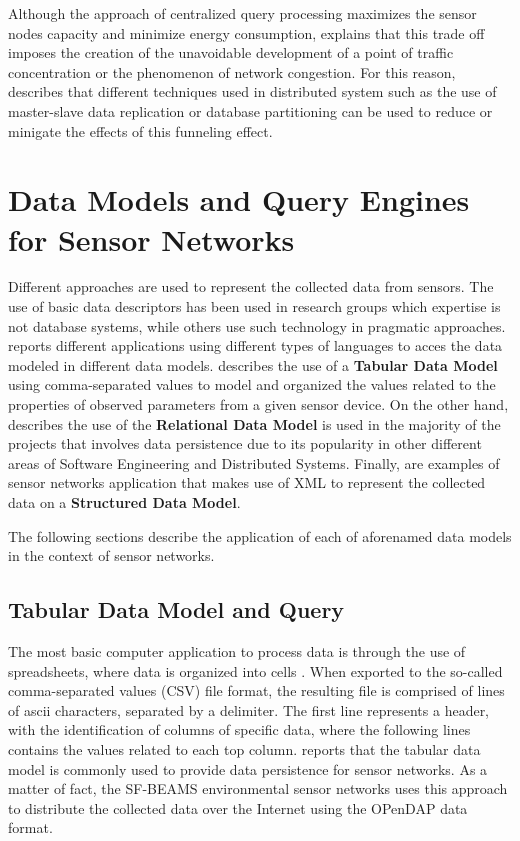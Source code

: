 Although the approach of centralized query processing maximizes the sensor
nodes capacity and minimize energy consumption, \cite{sn-storage02} explains
that this trade off imposes the creation of the unavoidable development of a
point of traffic concentration or the phenomenon of network congestion. For
this reason, \cite{sn-storage04} describes that different techniques used in 
distributed system such as the use of master-slave data replication or 
database partitioning \cite{db-partitioning-relational} can be used to reduce
or minigate the effects of this funneling effect.

\section{Data Models and Query Engines for Sensor Networks}
\label{sec:data-models}

Different approaches are used to represent the collected data from sensors. The
use of basic data descriptors has been used in research groups which expertise
is not database systems, while others use such technology in pragmatic
approaches. \cite{sn-programming-language} reports different applications using
different types of languages to acces the data modeled in different data
models. \cite{sn-provenance} describes the use of a \textbf{Tabular Data Model}
\cite{tabular-model} using comma-separated values to model and organized the
values related to the properties of observed parameters from a given sensor
device. On the other hand, \cite{sn-db-tinydb} describes the use of the
\textbf{Relational Data Model} \cite{relational-model} is used in the majority
of the projects that involves data persistence due to its popularity in other
different areas of Software Engineering and Distributed Systems. Finally,
\cite{sn-xml-usage01, sn-xml-usage02} are examples of sensor networks
application that makes use of XML \cite{xml} to represent the collected data
on a \textbf{Structured Data Model}.

The following sections describe the application of each of aforenamed data
models in the context of sensor networks.

\subsection{Tabular Data Model and Query}

The most basic computer application to process data is through the use of
spreadsheets, where data is organized into cells \cite{tabular-model}. When
exported to the so-called comma-separated values (CSV) file format, the
resulting file is comprised of lines of ascii characters, separated by a
delimiter. The first line represents a header, with the identification of
columns of specific data, where the following lines contains the values
related to each top column. \cite{sn-provenance} reports that the tabular
data model is commonly used to provide data persistence for sensor networks.
As a matter of fact, the SF-BEAMS environmental sensor networks
\cite{sfbeams2006} uses this approach to distribute the collected data over
the Internet using the OPenDAP \cite{opendap} data format.

